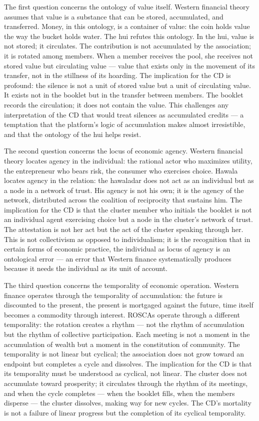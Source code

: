 The first question concerns the ontology of value itself. Western financial theory assumes that value is a substance that can be stored, accumulated, and transferred. Money, in this ontology, is a container of value: the coin holds value the way the bucket holds water. The hui refutes this ontology. In the hui, value is not stored; it circulates. The contribution is not accumulated by the association; it is rotated among members. When a member receives the pool, she receives not stored value but circulating value — value that exists only in the movement of its transfer, not in the stillness of its hoarding. The implication for the CD is profound: the silence is not a unit of stored value but a unit of circulating value. It exists not in the booklet but in the transfer between members. The booklet records the circulation; it does not contain the value. This challenges any interpretation of the CD that would treat silences as accumulated credits — a temptation that the platform's logic of accumulation makes almost irresistible, and that the ontology of the hui helps resist.

The second question concerns the locus of economic agency. Western financial theory locates agency in the individual: the rational actor who maximizes utility, the entrepreneur who bears risk, the consumer who exercises choice. Hawala locates agency in the relation: the hawaladar does not act as an individual but as a node in a network of trust. His agency is not his own; it is the agency of the network, distributed across the coalition of reciprocity that sustains him. The implication for the CD is that the cluster member who initials the booklet is not an individual agent exercising choice but a node in the cluster's network of trust. The attestation is not her act but the act of the cluster speaking through her. This is not collectivism as opposed to individualism; it is the recognition that in certain forms of economic practice, the individual as locus of agency is an ontological error — an error that Western finance systematically produces because it needs the individual as its unit of account.

The third question concerns the temporality of economic operation. Western finance operates through the temporality of accumulation: the future is discounted to the present, the present is mortgaged against the future, time itself becomes a commodity through interest. ROSCAs operate through a different temporality: the rotation creates a rhythm — not the rhythm of accumulation but the rhythm of collective participation. Each meeting is not a moment in the accumulation of wealth but a moment in the constitution of community. The temporality is not linear but cyclical; the association does not grow toward an endpoint but completes a cycle and dissolves. The implication for the CD is that its temporality must be understood as cyclical, not linear. The cluster does not accumulate toward prosperity; it circulates through the rhythm of its meetings, and when the cycle completes — when the booklet fills, when the members disperse — the cluster dissolves, making way for new cycles. The CD's mortality is not a failure of linear progress but the completion of its cyclical temporality.


